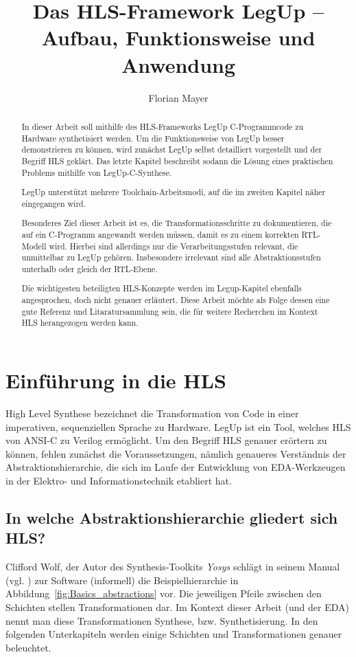 \documentclass[oneside,a4paper]{article}
\newcommand\blankpage{%
  \null
  \thispagestyle{empty}
  \newpage}
\begin{document}
\title{Das HLS-Framework LegUp -- Aufbau, Funktionsweise und Anwendung}
\author{\color{darkblue}Florian Mayer}
\maketitle
\afterpage{\blankpage}
\pagebreak
\tableofcontents
\pagebreak

\begin{abstract}
In dieser Arbeit soll mithilfe des HLS-Frameworks LegUp
C-Programmcode zu Hardware synthetisiert werden.
Um die Funktionsweise von LegUp besser demonstrieren zu können,
wird zunächst LegUp selbst detailliert vorgestellt und der Begriff
HLS geklärt. Das letzte Kapitel beschreibt sodann die Lösung
eines praktischen Problems mithilfe von LegUp-C-Synthese.

LegUp unterstützt mehrere Toolchain-Arbeitsmodi, auf die im zweiten
Kapitel näher eingegangen wird.

Besonderes Ziel dieser Arbeit ist es, die
Transformationsschritte zu dokumentieren, die auf ein C-Programm
angewandt werden müssen, damit
es zu einem korrekten RTL-Modell wird. Hierbei
sind allerdings nur die Verarbeitungsstufen relevant, die unmittelbar zu
LegUp gehören. Insbesondere irrelevant sind alle Abstraktionsstufen
unterhalb oder gleich der RTL-Ebene.

Die wichtigesten beteiligten HLS-Konzepte werden im
Legup-Kapitel ebenfalls angesprochen, doch nicht genauer erläutert.
Diese Arbeit möchte
als Folge dessen eine gute Referenz und Litaratursammlung
sein, die für weitere Recherchen im Kontext HLS herangezogen werden kann.

\end{abstract}
\pagebreak
{}

\section{Einführung in die HLS}
High Level Synthese bezeichnet die Transformation von Code in einer
imperativen, sequenziellen Sprache zu Hardware. LegUp ist ein Tool,
welches HLS von ANSI-C zu Verilog ermöglicht.
Um den Begriff HLS genauer erörtern zu können, fehlen zunächst die
Voraussetzungen, nämlich genaueres Verständnis der Abstraktionshierarchie,
die sich im Laufe der Entwicklung von EDA-Werkzeugen
in der Elektro- und Informationstechnik etabliert hat.

\subsection{In welche Abstraktionshierarchie gliedert sich HLS?}
Clifford Wolf, der Autor des Synthesis-Toolkits \emph{Yosys} schlägt in
seinem Manual (vgl. \cite{WOLF2015}) zur Software (informell)
die Beispielhierarchie in Abbildung~\ref{fig:Basics_abstractions} vor.
Die jeweiligen Pfeile zwischen den Schichten stellen Transformationen dar.
Im Kontext dieser Arbeit (und der EDA) nennt man diese Transformationen
Synthese, bzw. Synthetisierung.
In den folgenden Unterkapiteln werden einige Schichten und
Transformationen genauer beleuchtet.
\end{document}
